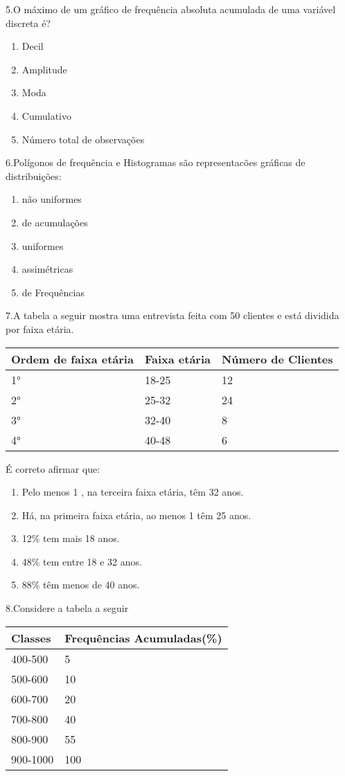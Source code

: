 \documentclass[]{book}
\begin{document}
5.O máximo de um gráfico de frequência absoluta acumulada de uma variável discreta é?

\begin{enumerate}
\def\labelenumi{\Alph{enumi})}
\item
  Decil
\item
  Amplitude
\item
  Moda
\item
  Cumulativo
\item
  Número total de observações
\end{enumerate}

6.Polígonos de frequência e Histogramas são representacões gráficas de distribuições:

\begin{enumerate}
\def\labelenumi{\Alph{enumi})}
\item
  não uniformes
\item
  de acumulações
\item
  uniformes
\item
  assimétricas
\item
  de Frequências
\end{enumerate}

7.A tabela a seguir mostra uma entrevista feita com 50 clientes e está dividida por faixa etária.

\begin{longtable}[]{@{}lll@{}}
\toprule
Ordem de faixa etária & Faixa etária & Número de Clientes\tabularnewline
\midrule
\endhead
1° & 18-25 & 12\tabularnewline
2° & 25-32 & 24\tabularnewline
3° & 32-40 & 8\tabularnewline
4° & 40-48 & 6\tabularnewline
\bottomrule
\end{longtable}

É correto afirmar que:

\begin{enumerate}
\def\labelenumi{\Alph{enumi})}
\item
  Pelo menos 1 , na terceira faixa etária, têm 32 anos.
\item
  Há, na primeira faixa etária, ao menos 1 têm 25 anos.
\item
  12\% tem mais 18 anos.
\item
  48\% tem entre 18 e 32 anos.
\item
  88\% têm menos de 40 anos.
\end{enumerate}

8.Considere a tabela a seguir

\begin{longtable}[]{@{}ll@{}}
\toprule
Classes & Frequências Acumuladas(\%)\tabularnewline
\midrule
\endhead
400-500 & 5\tabularnewline
500-600 & 10\tabularnewline
600-700 & 20\tabularnewline
700-800 & 40\tabularnewline
800-900 & 55\tabularnewline
900-1000 & 100\tabularnewline
\bottomrule
\end{longtable}
\end{document}
